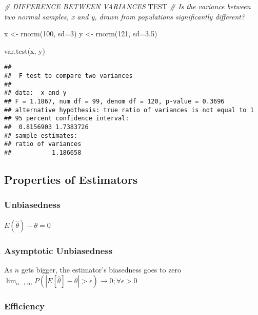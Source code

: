\documentclass[
]{article}
\newenvironment{Shaded}{\begin{snugshade}}{\end{snugshade}}
\newcommand{\AlertTok}[1]{\textcolor[rgb]{0.94,0.16,0.16}{#1}}
\newcommand{\AttributeTok}[1]{\textcolor[rgb]{0.77,0.63,0.00}{#1}}
\newcommand{\CommentTok}[1]{\textcolor[rgb]{0.56,0.35,0.01}{\textit{#1}}}
\newcommand{\DecValTok}[1]{\textcolor[rgb]{0.00,0.00,0.81}{#1}}
\newcommand{\FloatTok}[1]{\textcolor[rgb]{0.00,0.00,0.81}{#1}}
\newcommand{\FunctionTok}[1]{\textcolor[rgb]{0.00,0.00,0.00}{#1}}
\newcommand{\NormalTok}[1]{#1}
\newcommand{\OtherTok}[1]{\textcolor[rgb]{0.56,0.35,0.01}{#1}}
\begin{document}
\begin{Shaded}
\begin{Highlighting}[]
\CommentTok{\# DIFFERENCE BETWEEN VARIANCES }\AlertTok{TEST}
\CommentTok{\# Is the variance between two normal samples, x and y, drawn from populations significantly different?}

\NormalTok{x }\OtherTok{\textless{}{-}} \FunctionTok{rnorm}\NormalTok{(}\DecValTok{100}\NormalTok{, }\AttributeTok{sd=}\DecValTok{3}\NormalTok{)}
\NormalTok{y }\OtherTok{\textless{}{-}} \FunctionTok{rnorm}\NormalTok{(}\DecValTok{121}\NormalTok{, }\AttributeTok{sd=}\FloatTok{3.5}\NormalTok{)}

\FunctionTok{var.test}\NormalTok{(x, y)}
\end{Highlighting}
\end{Shaded}

\begin{verbatim}
## 
##  F test to compare two variances
## 
## data:  x and y
## F = 1.1867, num df = 99, denom df = 120, p-value = 0.3696
## alternative hypothesis: true ratio of variances is not equal to 1
## 95 percent confidence interval:
##  0.8156903 1.7383726
## sample estimates:
## ratio of variances 
##           1.186658
\end{verbatim}

\hypertarget{properties-of-estimators}{%
\subsection{Properties of Estimators}\label{properties-of-estimators}}

\hypertarget{unbiasedness}{%
\subsubsection{Unbiasedness}\label{unbiasedness}}

\(E(\hat{\theta}) - \theta = 0\)

\hypertarget{asymptotic-unbiasedness}{%
\subsubsection{Asymptotic Unbiasedness}\label{asymptotic-unbiasedness}}

As \(n\) gets bigger, the estimator's biasedness goes to zero
\(\lim_{n\to\infty} P(|E[\hat{\theta}] - \theta| > \epsilon) \to 0; \forall\epsilon >0\)

\hypertarget{efficiency}{%
\subsubsection{Efficiency}\label{efficiency}}
\end{document}
